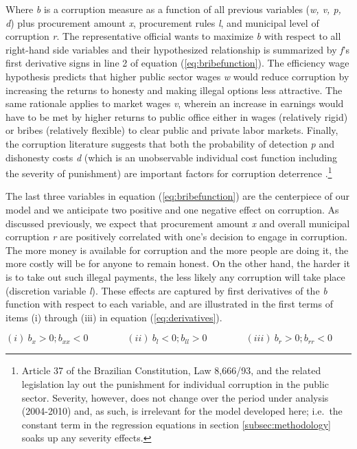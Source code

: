 \documentclass[11pt]{article}
\begin{document}
Where \emph{b} is a corruption measure as a function of all previous variables (\emph{w, v, p, d}) plus procurement amount \emph{x}, procurement rules \emph{l}, and municipal level of corruption \emph{r}. The representative official wants to maximize \emph{b} with respect to all right-hand side variables and their hypothesized relationship is summarized by \emph{f}'s first derivative signs in line 2 of equation (\ref{eq:bribefunction}). The efficiency wage hypothesis predicts that higher public sector wages \emph{w} would reduce corruption by increasing the returns to honesty and making illegal options less attractive. The same rationale applies to market wages \emph{v}, wherein an increase in earnings would have to be met by higher returns to public office either in wages (relatively rigid) or bribes (relatively flexible) to clear public and private labor markets. Finally, the corruption literature suggests that both the probability of detection \emph{p} and dishonesty costs \emph{d} (which is an unobservable individual cost function including the severity of punishment) are important factors for corruption deterrence \citep{BeckerCrimePunishmentEconomic1968,Rose-AckermanEconomicsCorruption1975}.\footnote{Article 37 of the Brazilian Constitution, Law 8,666/93, and the related legislation lay out the punishment for individual corruption in the public sector. Severity, however, does not change over the period under analysis (2004-2010) and, as such, is irrelevant for the model developed here; i.e.~the constant term in the regression equations in section \ref{subsec:methodology} soaks up any severity effects.}

The last three variables in equation (\ref{eq:bribefunction}) are the centerpiece of our model and we anticipate two positive and one negative effect on corruption. As discussed previously, we expect that procurement amount \emph{x} and overall municipal corruption \emph{r} are positively correlated with one's decision to engage in corruption. The more money is available for corruption and the more people are doing it, the more costly will be for anyone to remain honest. On the other hand, the harder it is to take out such illegal payments, the less likely any corruption will take place (discretion variable \emph{l}). These effects are captured by first derivatives of the \emph{b} function with respect to each variable, and are illustrated in the first terms of items (i) through (iii) in equation (\ref{eq:derivatives}).

\begin{equation} \label{eq:derivatives}
  (i) \   b_{x} > 0; b_{xx} < 0 \qquad \qquad
  (ii) \  b_{l} < 0; b_{ll} > 0 \qquad \qquad
  (iii) \ b_{r} > 0; b_{rr} < 0 \qquad \qquad
\end{equation}
\end{document}
